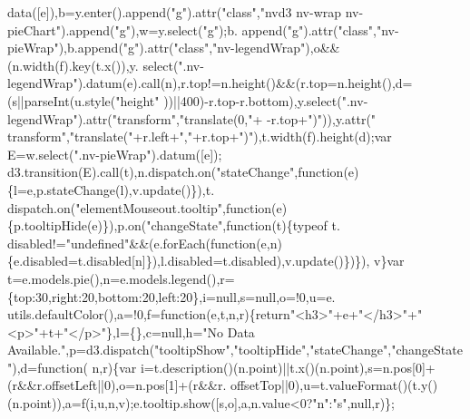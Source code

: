 \begin{DoxyCode}
      data([e]),b=y.enter().append(\textcolor{stringliteral}{"g"}).attr(\textcolor{stringliteral}{"class"},\textcolor{stringliteral}{"nvd3 nv-wrap nv-pieChart"}).append(\textcolor{stringliteral}{"g"}),w=y.select(\textcolor{stringliteral}{"g"});b.
      append(\textcolor{stringliteral}{"g"}).attr(\textcolor{stringliteral}{"class"},\textcolor{stringliteral}{"nv-pieWrap"}),b.append(\textcolor{stringliteral}{"g"}).attr(\textcolor{stringliteral}{"class"},\textcolor{stringliteral}{"nv-legendWrap"}),o&&(n.width(f).key(t.x()),y.
      select(\textcolor{stringliteral}{".nv-legendWrap"}).datum(e).call(n),r.top!=n.height()&&(r.top=n.height(),d=(s||parseInt(u.style(\textcolor{stringliteral}{"height"}
      ))||400)-r.top-r.bottom),y.select(\textcolor{stringliteral}{".nv-legendWrap"}).attr(\textcolor{stringliteral}{"transform"},\textcolor{stringliteral}{"translate(0,"}+ -r.top+\textcolor{stringliteral}{")"})),y.attr(\textcolor{stringliteral}{"
      transform"},\textcolor{stringliteral}{"translate("}+r.left+\textcolor{stringliteral}{","}+r.top+\textcolor{stringliteral}{")"}),t.width(f).height(d);var E=w.select(\textcolor{stringliteral}{".nv-pieWrap"}).datum([e]);
      d3.transition(E).call(t),n.dispatch.on(\textcolor{stringliteral}{"stateChange"},\textcolor{keyword}{function}(e)\{l=e,p.stateChange(l),v.update()\}),t.
      dispatch.on(\textcolor{stringliteral}{"elementMouseout.tooltip"},\textcolor{keyword}{function}(e)\{p.tooltipHide(e)\}),p.on(\textcolor{stringliteral}{"changeState"},\textcolor{keyword}{function}(t)\{typeof t.
      disabled!=\textcolor{stringliteral}{"undefined"}&&(e.forEach(\textcolor{keyword}{function}(e,n)\{e.disabled=t.disabled[n]\}),l.disabled=t.disabled),v.update()\})\}),
      v\}var t=e.models.pie(),n=e.models.legend(),r=\{top:30,right:20,bottom:20,left:20\},i=null,s=null,o=!0,u=e.
      utils.defaultColor(),a=!0,f=\textcolor{keyword}{function}(e,t,n,r)\{\textcolor{keywordflow}{return}\textcolor{stringliteral}{"<h3>"}+e+\textcolor{stringliteral}{"</h3>"}+\textcolor{stringliteral}{"<p>"}+t+\textcolor{stringliteral}{"</p>"}\},l=\{\},c=null,h=\textcolor{stringliteral}{"No Data
       Available."},p=d3.dispatch(\textcolor{stringliteral}{"tooltipShow"},\textcolor{stringliteral}{"tooltipHide"},\textcolor{stringliteral}{"stateChange"},\textcolor{stringliteral}{"changeState"}),d=\textcolor{keyword}{function}(
      n,r)\{var i=t.description()(n.point)||t.x()(n.point),s=n.pos[0]+(r&&r.offsetLeft||0),o=n.pos[1]+(r&&r.
      offsetTop||0),u=t.valueFormat()(t.y()(n.point)),a=f(i,u,n,v);e.tooltip.show([s,o],a,n.value<0?\textcolor{stringliteral}{"n"}:\textcolor{stringliteral}{"s"},null,r)\};\textcolor{keywordflow}{
}
\end{DoxyCode}
